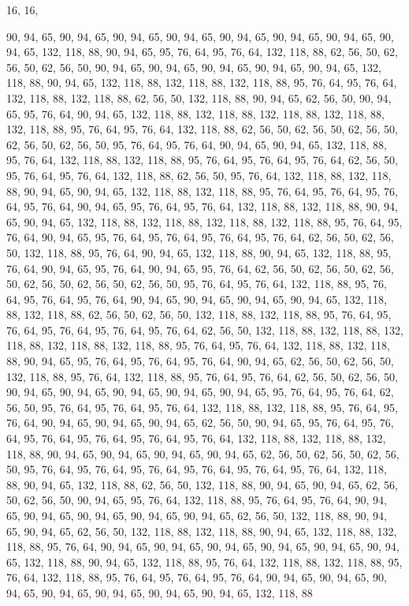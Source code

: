 16, 16,

90, 94, 65, 90, 94, 65, 90, 94, 65, 90, 94, 65, 90, 94, 65, 90,
94, 65, 90, 94, 65, 90, 94, 65, 132, 118, 88, 90, 94, 65, 95, 76,
64, 95, 76, 64, 132, 118, 88, 62, 56, 50, 62, 56, 50, 62, 56, 50,
90, 94, 65, 90, 94, 65, 90, 94, 65, 90, 94, 65, 90, 94, 65, 132,
118, 88, 90, 94, 65, 132, 118, 88, 132, 118, 88, 132, 118, 88, 95, 76,
64, 95, 76, 64, 132, 118, 88, 132, 118, 88, 62, 56, 50, 132, 118, 88,
90, 94, 65, 62, 56, 50, 90, 94, 65, 95, 76, 64, 90, 94, 65, 132,
118, 88, 132, 118, 88, 132, 118, 88, 132, 118, 88, 132, 118, 88, 95, 76,
64, 95, 76, 64, 132, 118, 88, 62, 56, 50, 62, 56, 50, 62, 56, 50,
62, 56, 50, 62, 56, 50, 95, 76, 64, 95, 76, 64, 90, 94, 65, 90,
94, 65, 132, 118, 88, 95, 76, 64, 132, 118, 88, 132, 118, 88, 95, 76,
64, 95, 76, 64, 95, 76, 64, 62, 56, 50, 95, 76, 64, 95, 76, 64,
132, 118, 88, 62, 56, 50, 95, 76, 64, 132, 118, 88, 132, 118, 88, 90,
94, 65, 90, 94, 65, 132, 118, 88, 132, 118, 88, 95, 76, 64, 95, 76,
64, 95, 76, 64, 95, 76, 64, 90, 94, 65, 95, 76, 64, 95, 76, 64,
132, 118, 88, 132, 118, 88, 90, 94, 65, 90, 94, 65, 132, 118, 88, 132,
118, 88, 132, 118, 88, 132, 118, 88, 95, 76, 64, 95, 76, 64, 90, 94,
65, 95, 76, 64, 95, 76, 64, 95, 76, 64, 95, 76, 64, 62, 56, 50,
62, 56, 50, 132, 118, 88, 95, 76, 64, 90, 94, 65, 132, 118, 88, 90,
94, 65, 132, 118, 88, 95, 76, 64, 90, 94, 65, 95, 76, 64, 90, 94,
65, 95, 76, 64, 62, 56, 50, 62, 56, 50, 62, 56, 50, 62, 56, 50,
62, 56, 50, 62, 56, 50, 95, 76, 64, 95, 76, 64, 132, 118, 88, 95,
76, 64, 95, 76, 64, 95, 76, 64, 90, 94, 65, 90, 94, 65, 90, 94,
65, 90, 94, 65, 132, 118, 88, 132, 118, 88, 62, 56, 50, 62, 56, 50,
132, 118, 88, 132, 118, 88, 95, 76, 64, 95, 76, 64, 95, 76, 64, 95,
76, 64, 95, 76, 64, 62, 56, 50, 132, 118, 88, 132, 118, 88, 132, 118,
88, 132, 118, 88, 132, 118, 88, 95, 76, 64, 95, 76, 64, 132, 118, 88,
132, 118, 88, 90, 94, 65, 95, 76, 64, 95, 76, 64, 95, 76, 64, 90,
94, 65, 62, 56, 50, 62, 56, 50, 132, 118, 88, 95, 76, 64, 132, 118,
88, 95, 76, 64, 95, 76, 64, 62, 56, 50, 62, 56, 50, 90, 94, 65,
90, 94, 65, 90, 94, 65, 90, 94, 65, 90, 94, 65, 95, 76, 64, 95,
76, 64, 62, 56, 50, 95, 76, 64, 95, 76, 64, 95, 76, 64, 132, 118,
88, 132, 118, 88, 95, 76, 64, 95, 76, 64, 90, 94, 65, 90, 94, 65,
90, 94, 65, 62, 56, 50, 90, 94, 65, 95, 76, 64, 95, 76, 64, 95,
76, 64, 95, 76, 64, 95, 76, 64, 95, 76, 64, 132, 118, 88, 132, 118,
88, 132, 118, 88, 90, 94, 65, 90, 94, 65, 90, 94, 65, 90, 94, 65,
62, 56, 50, 62, 56, 50, 62, 56, 50, 95, 76, 64, 95, 76, 64, 95,
76, 64, 95, 76, 64, 95, 76, 64, 95, 76, 64, 132, 118, 88, 90, 94,
65, 132, 118, 88, 62, 56, 50, 132, 118, 88, 90, 94, 65, 90, 94, 65,
62, 56, 50, 62, 56, 50, 90, 94, 65, 95, 76, 64, 132, 118, 88, 95,
76, 64, 95, 76, 64, 90, 94, 65, 90, 94, 65, 90, 94, 65, 90, 94,
65, 90, 94, 65, 62, 56, 50, 132, 118, 88, 90, 94, 65, 90, 94, 65,
62, 56, 50, 132, 118, 88, 132, 118, 88, 90, 94, 65, 132, 118, 88, 132,
118, 88, 95, 76, 64, 90, 94, 65, 90, 94, 65, 90, 94, 65, 90, 94,
65, 90, 94, 65, 90, 94, 65, 132, 118, 88, 90, 94, 65, 132, 118, 88,
95, 76, 64, 132, 118, 88, 132, 118, 88, 95, 76, 64, 132, 118, 88, 95,
76, 64, 95, 76, 64, 95, 76, 64, 90, 94, 65, 90, 94, 65, 90, 94,
65, 90, 94, 65, 90, 94, 65, 90, 94, 65, 90, 94, 65, 132, 118, 88
